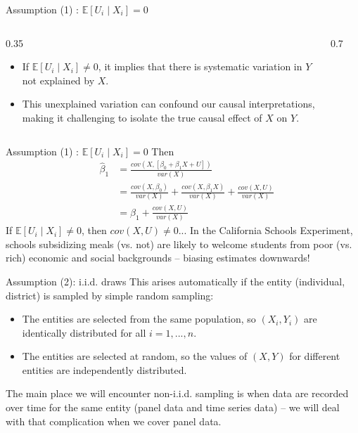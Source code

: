 \documentclass[notes,10pt, aspectratio=169]{beamer}
\begin{document}
\begin{frame}{Assumption (1) : $\mathbb{E}[U_i\mid X_i]=0$}
 \begin{columns}
\begin{column}{0.35\textwidth}
\begin{itemize}
\item If \(\mathbb{E}[U_i\mid X_i] \neq 0\), it implies that there is systematic variation in \(Y\) not explained by \(X\).
\item This unexplained variation can confound our causal interpretations, making it challenging to isolate the true causal effect of \(X\) on \(Y\).
\end{itemize}
\end{column}
\begin{column}{0.7\textwidth}
\begin{figure}
  \centering
         \vspace{-1mm}
        \resizebox{!}{0.70\textheight}{}
\end{figure}
\end{column}
\end{columns}
\end{frame}



\begin{frame}{Assumption (1) : $\mathbb{E}[U_i\mid X_i]=0$}
Then
\begin{eqnarray*}
    & \hat{\beta}_1 &= \frac{cov(X,[\beta_0 + \beta_1 X + U])}{var(X)}\\
    & &= \frac{cov(X,\beta_0)}{var(X)}+\frac{cov(X,\beta_1 X)}{var(X)}+\frac{cov(X,U)}{var(X)}\\
    & &= \beta_1+\frac{cov(X,U)}{var(X)}
\end{eqnarray*}
If $\mathbb{E}[U_i\mid X_i]\neq 0$, then $cov(X,U) \neq 0$... In the California Schools Experiment, schools subsidizing meals (vs. not) are likely to welcome students from poor (vs. rich) economic and social backgrounds -- biasing estimates downwards!
\end{frame}



\begin{frame}{Assumption (2): i.i.d. draws}
This arises automatically if the entity (individual, district) is sampled by simple random sampling:
\begin{itemize}
    \item The entities are selected from the same population, so $(X_i, Y_i)$  are identically distributed for all $i=1,...,n$.
    \item The entities are selected at random, so the values of $(X, Y)$ for different entities are independently distributed.
\end{itemize}
The main place we will encounter non-i.i.d. sampling is when data are recorded over time for the same entity (panel data and time series data) – we will deal with that complication when we cover panel data.
\end{frame}
\end{document}
